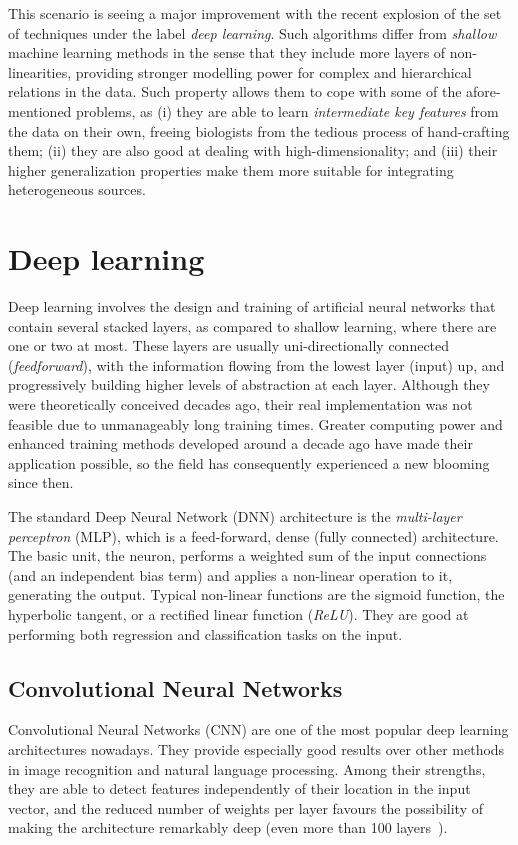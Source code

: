 \documentclass[journal]{IEEEtran}
\begin{document}
This scenario is seeing a major improvement with the recent explosion of the set of techniques under the label \textit{deep learning}. Such algorithms differ from \textit{shallow} machine learning methods in the sense that they include more layers of non-linearities, providing stronger modelling power for complex and hierarchical relations in the data. Such property allows them to cope with some of the afore-mentioned problems, as (i) they are able to learn \textit{intermediate key features} from the data on their own, freeing biologists from the tedious process of hand-crafting them; (ii) they are also good at dealing with high-dimensionality; and (iii) their higher generalization properties make them more suitable for integrating heterogeneous sources.

\section{Deep learning}

Deep learning involves the design and training of artificial neural networks that contain several stacked layers, as compared to shallow learning, where there are one or two at most. These layers are usually uni-directionally connected (\textit{feedforward}), with the information flowing from the lowest layer (input) up, and progressively building higher levels of abstraction at each layer. Although they were theoretically conceived decades ago, their real implementation was not feasible due to unmanageably long training times. Greater computing power and enhanced training methods developed around a decade ago have made their application possible, so the field has consequently experienced a new blooming since then.

The standard Deep Neural Network (DNN) architecture is the \textit{multi-layer perceptron} (MLP), which is a feed-forward, dense (fully connected) architecture. The basic unit, the neuron, performs a weighted sum of the input connections (and an independent bias term) and applies a non-linear operation to it, generating the output. Typical non-linear functions are the sigmoid function, the hyperbolic tangent, or a rectified linear function (\textit{ReLU}). They are good at performing both regression and classification tasks on the input.

\subsection{Convolutional Neural Networks}
Convolutional Neural Networks (CNN) are one of the most popular deep learning architectures nowadays. They provide especially good results over other methods in image recognition and natural language processing. Among their strengths, they are able to detect features independently of their location in the input vector, and the reduced number of weights per layer favours the possibility of making the architecture remarkably deep (even more than 100 layers~\cite{He2015}).
\end{document}
